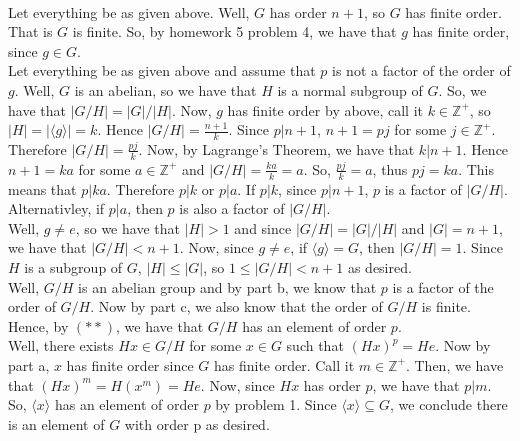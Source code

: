 \begin{solution}\renewcommand{\qedsymbol}{}\ \\
    Let everything be as given above. Well, $G$ has order $n+1$, so $G$ has finite order. That is $G$ is
    finite. So, by homework 5 problem 4, we have that $g$ has finite order, since $g\in G$.\\

    Let everything be as given above and assume that $p$ is not a factor of the order of $g$. Well, $G$
    is an abelian, so we have that $H$ is a normal subgroup of $G$. So, we have that $|G/H|=|G|/|H|$.
    Now, $g$ has finite order by above, call it $k\in\mathbb{Z}^+$, so $|H|=|\langle g\rangle|=k$. Hence
    $|G/H|=\frac{n+1}{k}$. Since $p|n+1$, $n+1=pj$ for some $j\in\mathbb{Z}^+$. Therefore
    $|G/H|=\frac{pj}{k}$. Now, by Lagrange's Theorem, we have that $k|n+1$. Hence $n+1=ka$ for some
    $a\in\mathbb{Z}^+$ and $|G/H|=\frac{ka}{k}=a$. So, $\frac{pj}{k}=a$, thus $pj=ka$. This means that
    $p|ka$. Therefore $p|k$ or $p|a$. If $p|k$, since $p|n+1$, $p$ is a factor of $|G/H|$.
    Alternativley, if $p|a$, then $p$ is also a factor of $|G/H|$.\\

    Well, $g\neq e$, so we have that $|H|>1$ and since $|G/H|=|G|/|H|$ and $|G|=n+1$, we have that
    $|G/H|<n+1$. Now, since $g\neq e$, if $\langle g\rangle=G$, then $|G/H|=1$. Since $H$ is a subgroup
    of $G$, $|H|\leq|G|$, so $1\leq|G/H|<n+1$ as desired.\\

    Well, $G/H$ is an abelian group and by part b, we know that $p$ is a factor of the order of $G/H$.
    Now by part c, we also know that the order of $G/H$ is finite. Hence, by $(**)$, we have that $G/H$
    has an element of order $p$.\\

    Well, there exists $Hx\in G/H$ for some $x\in G$ such that $(Hx)^p=He$. Now by part a, $x$ has
    finite order since $G$ has finite order. Call it $m\in\mathbb{Z}^+$. Then, we have that
    $(Hx)^m=H(x^m)=He$. Now, since $Hx$ has order $p$, we have that $p|m$. So, $\langle x\rangle$ has an
    element of order $p$ by problem 1. Since $\langle x\rangle\subseteq G$, we conclude there is an
    element of $G$ with order p as desired.

\end{solution}